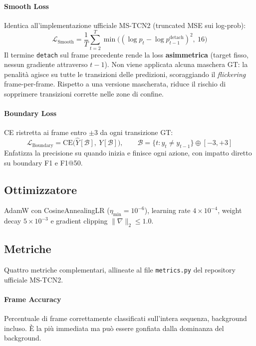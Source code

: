 \documentclass[12pt, a4paper]{article}
\begin{document}
\paragraph{Smooth Loss}
Identica all'implementazione ufficiale MS-TCN2 (truncated MSE sui log-prob):
\begin{equation}
  \mathcal{L}_{\text{Smooth}} = \frac{1}{T}\sum_{t=2}^{T}
  \min\!\bigl( (\log p_t - \log p_{t-1}^{\text{detach}})^2,\ 16 \bigr)
\end{equation}
Il termine \texttt{detach} sul frame precedente rende la loss
\textbf{asimmetrica} (target fisso, nessun gradiente attraverso $t{-}1$).
Non viene applicata alcuna maschera GT: la penalit\`a agisce su tutte le
transizioni delle predizioni, scoraggiando il \textit{flickering}
frame-per-frame. Rispetto a una versione mascherata, riduce il rischio di
sopprimere transizioni corrette nelle zone di confine.

\paragraph{Boundary Loss}
CE ristretta ai frame entro $\pm 3$ da ogni transizione GT:
\begin{equation}
  \mathcal{L}_{\text{Boundary}} =
  \text{CE}\bigl(\hat{Y}[\mathcal{B}],\ Y[\mathcal{B}]\bigr),
  \qquad
  \mathcal{B} = \{t : y_t \neq y_{t-1}\} \oplus [-3, +3]
\end{equation}
Enfatizza la precisione su quando inizia e finisce ogni azione, con impatto
diretto su boundary F1 e F1@50.

\subsection{Ottimizzatore}
AdamW \cite{loshchilov2017decoupled} con CosineAnnealingLR
($\eta_{\min} = 10^{-6}$), learning rate $4\times10^{-4}$,
weight decay $5\times10^{-3}$ e gradient clipping $\|\nabla\|_2 \leq 1.0$.

\subsection{Metriche}
Quattro metriche complementari, allineate al file \texttt{metrics.py}
del repository ufficiale MS-TCN2.

\paragraph{Frame Accuracy} Percentuale di frame correttamente classificati
sull'intera sequenza, background incluso. \`E la pi\`u immediata ma pu\`o essere
gonfiata dalla dominanza del background.
\end{document}
